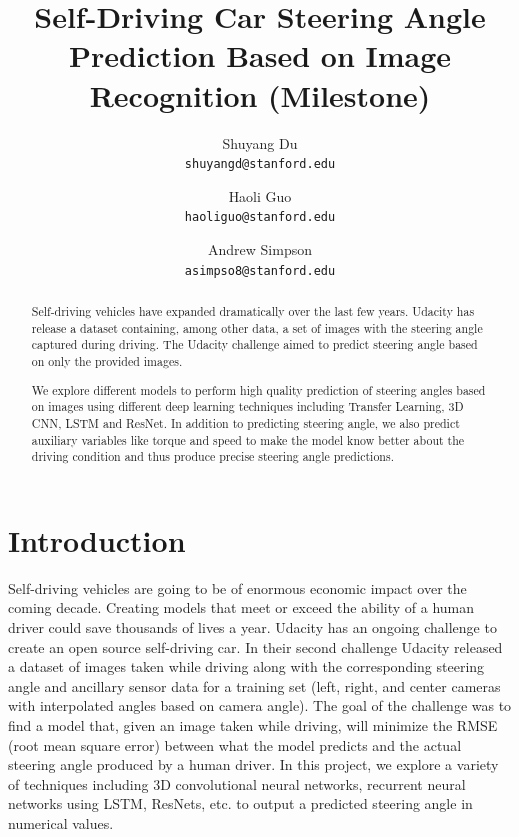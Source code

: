 \documentclass[10pt,twocolumn,letterpaper]{article}
\begin{document}
\title{Self-Driving Car Steering Angle Prediction Based on Image Recognition (Milestone)}

\author{Shuyang Du\\
{\tt\small shuyangd@stanford.edu}
\and
Haoli Guo\\
{\tt\small haoliguo@stanford.edu}
\and
Andrew Simpson\\
{\tt\small asimpso8@stanford.edu}
}

\maketitle

\begin{abstract}
Self-driving vehicles have expanded dramatically over the last few years. Udacity has release a dataset containing, among other data, a set of images with the steering angle captured during driving. The Udacity challenge aimed to predict steering angle based on only the provided images. 

We explore different models to perform high quality prediction of steering angles based on images using different deep learning techniques including Transfer Learning, 3D CNN, LSTM and ResNet. In addition to predicting steering angle, we also predict auxiliary variables like torque and speed to make the model know better about the driving condition and thus produce precise steering angle predictions.

\end{abstract}

\section{Introduction}
Self-driving vehicles are going to be of enormous economic impact over the coming decade. Creating models that meet or exceed the ability of a human driver could save thousands of lives a year. Udacity has an ongoing challenge to create an open source self-driving car. In their second challenge Udacity released a dataset of images taken while driving along with the corresponding steering angle and ancillary sensor data for a training set (left, right, and center cameras with interpolated angles based on camera angle). The goal of the challenge was to find a model that, given an image taken while driving, will minimize the RMSE (root mean square error) between what the model predicts and the actual steering angle produced by a human driver. In this project, we explore a variety of techniques including 3D convolutional neural networks, recurrent neural networks using LSTM, ResNets, etc. to output a predicted steering angle in numerical values.
\end{document}
